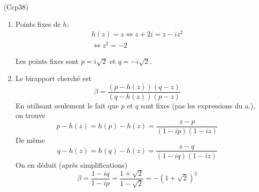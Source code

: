 \begin{tiny}(Ccp38)\end{tiny}
\begin{enumerate}
 \item Points fixes de $h$:
\begin{multline*}
 h(z)=z 
 \Leftrightarrow z+2i = z -iz^2\\
 \Leftrightarrow z^2 = -2
\end{multline*}

Les points fixes sont $p=i\sqrt{2}$ et $q=-i\sqrt{2}$.
 \item Le birapport cherché est
\begin{displaymath}
 \beta = \frac{(p-h(z))(q-z)}{(q-h(z))(p-z)}
\end{displaymath}
En utilisant seulement le fait que $p$ et $q$ sont fixes (pas les expressions du a.), on trouve
\begin{displaymath}
 p-h(z) = h(p)-h(z)
 =\frac{z-p}{(1-ip)(1-iz)}
\end{displaymath}
De même
\begin{displaymath}
 q-h(z) = h(q)-h(z)
 =\frac{z-q}{(1-iq)(1-iz)}
\end{displaymath}
On en déduit (après simplifications)
\begin{displaymath}
 \beta = \frac{1-iq}{1-ip} = \frac{1+\sqrt{2}}{1-\sqrt{2}} =-(1+\sqrt{2})^2
\end{displaymath}

\end{enumerate}
